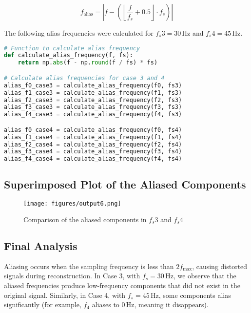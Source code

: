 \documentclass[10pt]{article}
\theoremstyle{definition}
\theoremstyle{remark}
\theoremstyle{definition}
\numberwithin{equation}{prob}
\begin{document}
\[
f_{\text{alias}} = \left| f - \left( \left\lfloor \frac{f}{f_s} + 0.5 \right\rfloor \cdot f_s \right) \right|
\]

The following alias frequencies were calculated for \( f_s3 = 30 \, \text{Hz} \) and \( f_s4 = 45 \, \text{Hz} \).

\begin{lstlisting}[language=Python, caption=Alias frequency calculation]
# Function to calculate alias frequency
def calculate_alias_frequency(f, fs):
    return np.abs(f - np.round(f / fs) * fs)

# Calculate alias frequencies for case 3 and 4
alias_f0_case3 = calculate_alias_frequency(f0, fs3)
alias_f1_case3 = calculate_alias_frequency(f1, fs3)
alias_f2_case3 = calculate_alias_frequency(f2, fs3)
alias_f3_case3 = calculate_alias_frequency(f3, fs3)
alias_f4_case3 = calculate_alias_frequency(f4, fs3)

alias_f0_case4 = calculate_alias_frequency(f0, fs4)
alias_f1_case4 = calculate_alias_frequency(f1, fs4)
alias_f2_case4 = calculate_alias_frequency(f2, fs4)
alias_f3_case4 = calculate_alias_frequency(f3, fs4)
alias_f4_case4 = calculate_alias_frequency(f4, fs4)
\end{lstlisting}

\subsection{Superimposed Plot of the Aliased Components}

\begin{figure}[H]
    \centering
    \texttt{[image: figures/output6.png]}
    \caption{Comparison of the aliased components in \( f_s3 \) and \( f_s4 \)}
    \label{fig:comparison}
\end{figure}

\subsection{Final Analysis}

Aliasing occurs when the sampling frequency is less than \( 2f_{\text{max}} \), causing distorted signals during reconstruction. In Case 3, with \( f_s = 30 \, \text{Hz} \), we observe that the aliased frequencies produce low-frequency components that did not exist in the original signal. Similarly, in Case 4, with \( f_s = 45 \, \text{Hz} \), some components alias significantly (for example, \( f_4 \) aliases to \( 0 \, \text{Hz} \), meaning it disappears).
\end{document}
